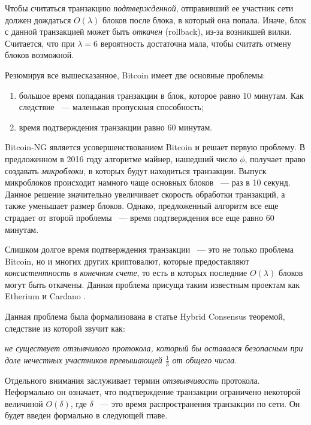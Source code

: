 Чтобы считаться транзакцию \textit{подтвержденной}, отправивший ее участник сети должен дождаться $O(\lambda)$  блоков после блока, в который она попала. Иначе, блок с данной транзакцией может быть \textit{откачен} (rollback), из-за возникшей вилки. Считается, что при $\lambda=6$ вероятность достаточна мала, чтобы считать отмену блоков возможной.\vspace{10pt}

Резюмируя все вышесказанное, Bitcoin имеет две основные проблемы:
\begin{enumerate}
\item большое время попадания транзакции в блок, которое равно 10 минутам. Как следствие ~--- маленькая пропускная способность;
\item время подтверждения транзакции равно 60 минутам.
\end{enumerate} \vspace{10pt}

Bitcoin-NG \cite{bitcoin-ng} является усовершенствованием Bitcoin и решает первую проблему. В предложенном в 2016 году алгоритме майнер, нашедший число $\phi$,  получает право создавать \textit{микроблоки}, в которых будут находиться транзакции. Выпуск микроблоков происходит намного чаще основных блоков ~--- раз в 10 секунд. Данное решение значительно увеличивает скорость обработки транзакций, а также уменьшает размер блоков.
Однако, предложенный алгоритм все еще страдает от второй проблемы ~--- время подтверждения все еще равно 60 минутам.

Слишком долгое время подтверждения транзакции ~--- это не только проблема Bitcoin, но и многих других криптовалют, которые предоставляют \textit{консистентность в конечном счете}, то есть в которых последние $O(\lambda)$ блоков могут быть откачены. Данная проблема присуща таким известным проектам как Etherium\cite{buterin2014ethereum} и Cardano \cite{cardano}.

Данная проблема была формализована в статье Hybrid Consensus \cite{hybrid-consensus} теоремой, следствие из которой звучит как: 
\par \textit{не существует отзывчивого протокола, который бы оставался безопасным при доле нечестных участников превышающей $\frac{1}{3}$ от общего числа}.

Отдельного внимания заслуживает термин \textit{отзвывчивость} протокола. Неформально он означает, что подтверждение транзакции ограничено некоторой величиной $O(\delta)$, где $\delta$ ~--- это время распространения транзакции по сети. Он будет введен формально в следующей главе.
 
